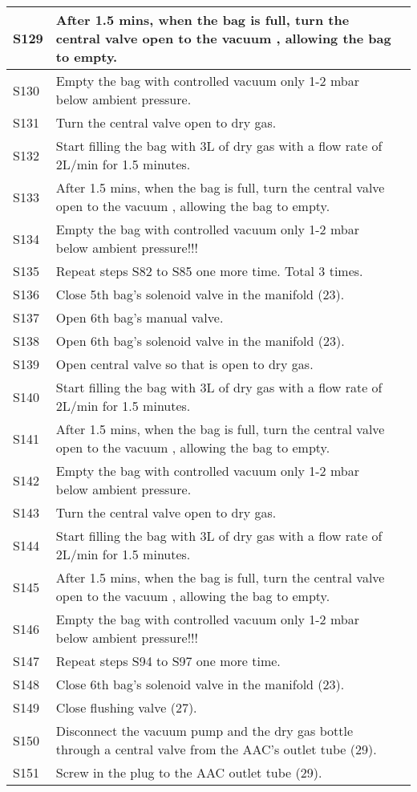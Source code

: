 \begin{longtable} {|m{}|m{}|m{}|}
S129 & After 1.5 mins, when the bag is full, turn the central valve open to the vacuum , allowing the bag to empty. & \\ \hline
S130 & Empty the bag with controlled vacuum only 1-2 mbar below ambient pressure. & \\ \hline
S131 & Turn the central valve open to dry gas. & \\ \hline
S132 & Start filling the bag with 3L of dry gas with a flow rate of 2L/min for 1.5 minutes. & \\ \hline
S133 & After 1.5 mins, when the bag is full, turn the central valve open to the vacuum , allowing the bag to empty. & \\ \hline
S134 & Empty the bag with controlled vacuum only 1-2 mbar below ambient pressure!!! & \\ \hline
S135 & Repeat steps S82 to S85 one more time. Total 3 times. & \\ \hline
S136 & Close 5th bag's solenoid valve in the manifold (23). & \\ \hline
S137 & Open 6th bag's manual valve. & \\ \hline
S138 & Open 6th bag's solenoid valve in the manifold (23). & \\ \hline
S139 & Open central valve so that is open to dry gas. & \\ \hline
S140 & Start filling the bag with 3L of dry gas with a flow rate of 2L/min for 1.5 minutes. & \\ \hline
S141 & After 1.5 mins, when the bag is full, turn the central valve open to the vacuum , allowing the bag to empty. & \\ \hline
S142 & Empty the bag with controlled vacuum only 1-2 mbar below ambient pressure. & \\ \hline
S143 & Turn the central valve open to dry gas. & \\ \hline
S144 & Start filling the bag with 3L of dry gas with a flow rate of 2L/min for 1.5 minutes. & \\ \hline
S145 & After 1.5 mins, when the bag is full, turn the central valve open to the vacuum , allowing the bag to empty. & \\ \hline
S146 & Empty the bag with controlled vacuum only 1-2 mbar below ambient pressure!!! & \\ \hline
S147 & Repeat steps S94 to S97 one more time. & \\ \hline
S148 & Close 6th bag's solenoid valve in the manifold (23). & \\ \hline
S149 & Close flushing valve (27). & \\ \hline
S150 & Disconnect the vacuum pump and the dry gas bottle through a central valve from the AAC's outlet tube (29). & \\ \hline
S151 & Screw in the plug to the AAC outlet tube (29). & \\ \hline




\end{longtable}
